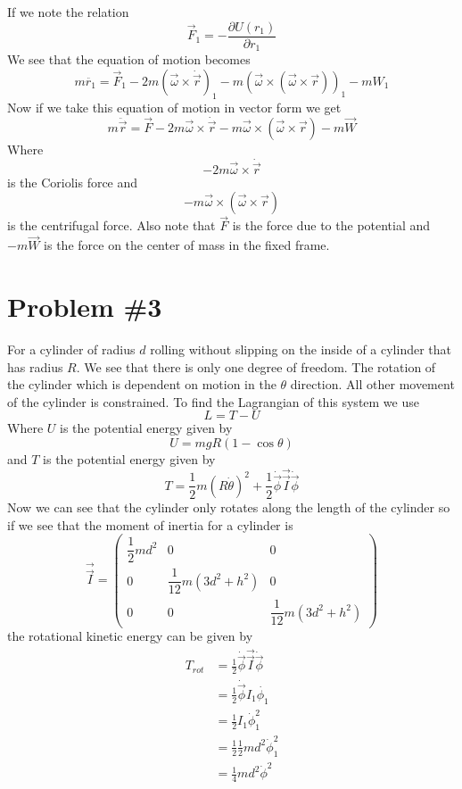 \documentclass[11pt]{article}
\numberwithin{equation}{section}
\begin{document}
If we note the relation 
$$\vec{F}_1 = -\frac{\partial U(r_1)}{\partial r_1}$$
We see that the equation of motion becomes 
$$m\ddot{r_1} = \vec{F}_1 - 2m\left(\vec{\omega}\times\dot{\vec{r}}\right)_1  -m\left(\vec{\omega}\times(\vec{\omega}\times\vec{r})\right)_1 - mW_1$$
Now if we take this equation of motion in vector form we get
$$m\ddot{\vec{r}} = \vec{F} - 2m\vec{\omega}\times\dot{\vec{r}}  -m\vec{\omega}\times(\vec{\omega}\times\vec{r}) - m\vec{W}$$
Where 
$$-2m\vec{\omega}\times\dot{\vec{r}}$$
is the Coriolis force and
$$-m\vec{\omega}\times(\vec{\omega}\times\vec{r})$$
is the centrifugal force. Also note that $\vec{F}$ is the force due to the potential and $-m\vec{W}$ is the force on the center of mass in the fixed frame.

\section{Problem \#3}
For a cylinder of radius $d$ rolling without slipping on the inside of a cylinder that has radius $R$. We see that there is only one degree of freedom. The rotation of the cylinder which is dependent on motion in the $\theta$ direction. All other movement of the cylinder is constrained. To find the Lagrangian of this system we use 
\begin{equation}
L = T-U
\label{lagran}
\end{equation}
Where $U$ is the potential energy given by
$$U = mgR(1-\cos\theta)$$
and $T$ is the potential energy given by
$$T = \frac{1}{2}m(R\dot{\theta})^2+\frac{1}{2}\dot{\vec{\phi}}\vec{\vec{I}}\dot{\vec{\phi}}$$
Now we can see that the cylinder only rotates along the length of the cylinder so if we see that the moment of inertia for a cylinder is
$$\vec{\vec{I}} = \left(\begin{array}{ccc}
		\dfrac{1}{2}md^2	&0	&0\\
		0			&\dfrac{1}{12}m(3d^2+h^2)	&0\\			
		0			&0	&\dfrac{1}{12}m(3d^2+h^2)
		\end{array}\right)$$			
the rotational kinetic energy can be given by
\begin{align*}
T_{rot} &= \frac{1}{2}\dot{\vec{\phi}}\vec{\vec{I}}\dot{\vec{\phi}}\\
&= \frac{1}{2}\dot{\vec{\phi}}I_1\dot{\phi_1}\\
&= \frac{1}{2}I_1\dot{\phi}_1^2\\
&= \frac{1}{2}\frac{1}{2}md^2\dot{\phi}_1^2\\
&= \frac{1}{4}md^2\dot{\phi}^2
\end{align*}
\end{document}
